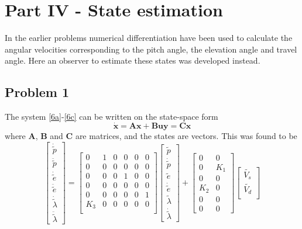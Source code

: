 
\section{Part IV - State estimation} \label{sec:part4}
In the earlier problems numerical differentiation have been used to calculate the angular velocities corresponding to the pitch angle, the elevation angle and travel angle. Here an observer to estimate these states was developed instead.

\subsection{Problem 1}
The system \eqref{6a}-\eqref{6c} can be written on the state-space form 
\begin{subequations}
\begin{equation*} 
    \boldsymbol{\dot{x} = Ax + Bu}
\end{equation*}
\begin{equation*}
    \boldsymbol{y = Cx}
\end{equation*}
\end{subequations}
where \textbf{A}, \textbf{B} and \textbf{C} are matrices, and the states are vectors. This was found to be
\[
\begin{bmatrix}
    \dot{\tilde p} \\
    \ddot{\tilde{p}}\\
    \dot{\tilde{e}}\\
    \ddot{\tilde e}\\
    \dot{\tilde{\lambda}}\\
    \ddot{\tilde{\lambda}}
\end{bmatrix}
=
\begin{bmatrix}
    0 & 1  & 0 & 0 & 0 & 0\\
    0 & 0  & 0 & 0 & 0 & 0\\
    0 & 0  & 0 & 1 & 0 & 0\\
    0 & 0  & 0 & 0 & 0 & 0\\
    0 & 0  & 0 & 0 & 0 & 1\\
    K_3 & 0  & 0 & 0 & 0 & 0\\
\end{bmatrix}
\begin{bmatrix}
    \tilde p \\
    \dot{\tilde{p}}\\
    \tilde{e}\\
    \dot{\tilde e}\\
    \tilde{\lambda}\\
    \dot{\tilde{\lambda}}
 \end{bmatrix}
 + 
 \begin{bmatrix}
    0 & 0 \\
    0 & K_1 \\
    0 & 0 \\ 
    K_2 & 0 \\
    0 & 0\\ 
    0 & 0
\end{bmatrix}
\begin{bmatrix}
    \tilde{V_s}\\
    \tilde{V_d}\\ 
\end{bmatrix}
\]
